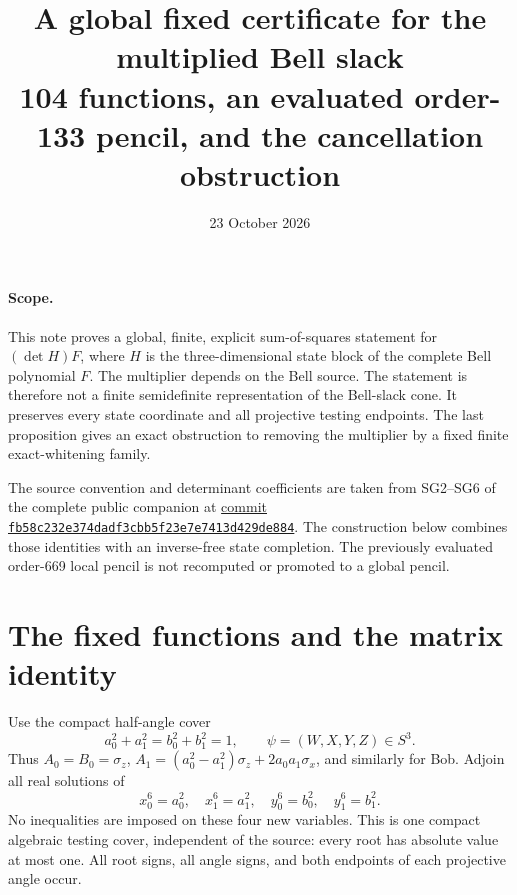 \documentclass[11pt]{article}
\title{A global fixed certificate for the multiplied Bell slack\\
\large 104 functions, an evaluated order-133 pencil, and the cancellation obstruction}
\author{}
\date{23 October 2026}
\begin{document}
\maketitle
\vspace{-2em}

\paragraph{Scope.}
This note proves a global, finite, explicit sum-of-squares statement for
$(\det H)F$, where $H$ is the three-dimensional state block of the complete
Bell polynomial $F$.  The multiplier depends on the Bell source.  The
statement is therefore not a finite semidefinite representation of the
Bell-slack cone.  It preserves every state coordinate and all projective
testing endpoints.  The last proposition gives an exact obstruction to
removing the multiplier by a fixed finite exact-whitening family.

The source convention and determinant coefficients are taken from
SG2--SG6 of the complete public companion at
\href{https://github.com/anubhav70747/q222-finite-sdp/tree/fb58c232e374dadf3cbb5f23e7e7413d429de884}
{commit \texttt{fb58c232e374dadf3cbb5f23e7e7413d429de884}}.
The construction below combines those identities with an inverse-free
state completion.  The previously evaluated order-669 local pencil is
not recomputed or promoted to a global pencil.

\section{The fixed functions and the matrix identity}

Use the compact half-angle cover
\[
 a_0^2+a_1^2=b_0^2+b_1^2=1,
 \qquad \psi=(W,X,Y,Z)\in S^3.
\]
Thus $A_0=B_0=\sigma_z$,
$A_1=(a_0^2-a_1^2)\sigma_z+2a_0a_1\sigma_x$, and similarly for Bob.
Adjoin all real solutions of
\[
 x_0^6=a_0^2,\quad x_1^6=a_1^2,\quad
 y_0^6=b_0^2,\quad y_1^6=b_1^2.                       \tag{1}
\]
No inequalities are imposed on these four new variables.  This is one
compact algebraic testing cover, independent of the source: every root
has absolute value at most one.  All root signs, all angle signs, and
both endpoints of each projective angle occur.
\end{document}
